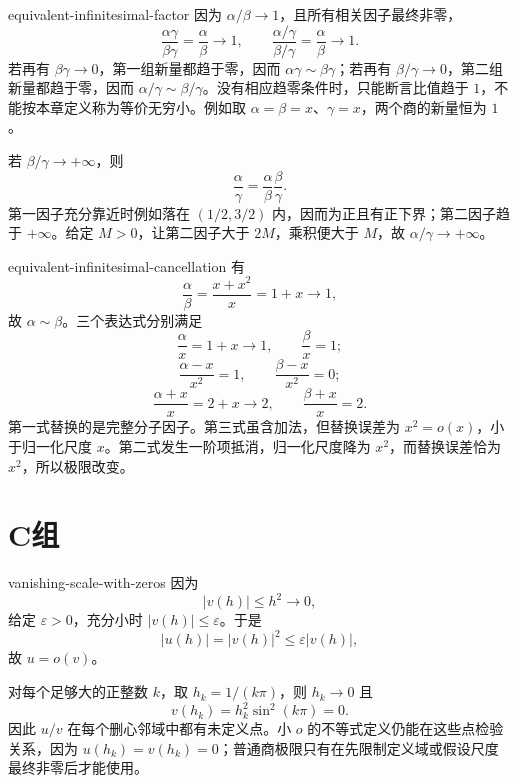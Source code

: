 \begin{solution}{equivalent-infinitesimal-factor}
因为 \(\alpha/\beta\to1\)，且所有相关因子最终非零，
\[
 \frac{\alpha\gamma}{\beta\gamma}
 =\frac\alpha\beta\longrightarrow1,
\qquad
 \frac{\alpha/\gamma}{\beta/\gamma}
 =\frac\alpha\beta\longrightarrow1.
\]
若再有 \(\beta\gamma\to0\)，第一组新量都趋于零，因而
\(\alpha\gamma\sim\beta\gamma\)；若再有 \(\beta/\gamma\to0\)，第二组新量都趋于零，因而
\(\alpha/\gamma\sim\beta/\gamma\)。没有相应趋零条件时，只能断言比值趋于 \(1\)，不能按本章定义称为等价无穷小。例如取
\(\alpha=\beta=x\)、\(\gamma=x\)，两个商的新量恒为 \(1\)。

若 \(\beta/\gamma\to+\infty\)，则
\[
 \frac\alpha\gamma
 =\frac\alpha\beta\frac\beta\gamma.
\]
第一因子充分靠近时例如落在 \((1/2,3/2)\) 内，因而为正且有正下界；第二因子趋于 \(+\infty\)。给定 \(M>0\)，让第二因子大于 \(2M\)，乘积便大于 \(M\)，故 \(\alpha/\gamma\to+\infty\)。
\end{solution}

\begin{solution}{equivalent-infinitesimal-cancellation}
有
\[
 \frac{\alpha}{\beta}
 =\frac{x+x^2}{x}=1+x\longrightarrow1,
\]
故 \(\alpha\sim\beta\)。三个表达式分别满足
\[
 \frac{\alpha}{x}=1+x\to1,\qquad
 \frac{\beta}{x}=1;
\]
\[
 \frac{\alpha-x}{x^2}=1,\qquad
 \frac{\beta-x}{x^2}=0;
\]
\[
 \frac{\alpha+x}{x}=2+x\to2,\qquad
 \frac{\beta+x}{x}=2.
\]
第一式替换的是完整分子因子。第三式虽含加法，但替换误差为 \(x^2=o(x)\)，小于归一化尺度 \(x\)。第二式发生一阶项抵消，归一化尺度降为 \(x^2\)，而替换误差恰为 \(x^2\)，所以极限改变。
\end{solution}

\section*{C组}

\begin{solution}{vanishing-scale-with-zeros}
因为
\[
 |v(h)|\le h^2\longrightarrow0,
\]
给定 \(\varepsilon>0\)，充分小时 \(|v(h)|\le\varepsilon\)。于是
\[
 |u(h)|=|v(h)|^2\le\varepsilon|v(h)|,
\]
故 \(u=o(v)\)。

对每个足够大的正整数 \(k\)，取 \(h_k=1/(k\pi)\)，则 \(h_k\to0\) 且
\[
 v(h_k)=h_k^2\sin^2(k\pi)=0.
\]
因此 \(u/v\) 在每个删心邻域中都有未定义点。小 \(o\) 的不等式定义仍能在这些点检验关系，因为 \(u(h_k)=v(h_k)=0\)；普通商极限只有在先限制定义域或假设尺度最终非零后才能使用。
\end{solution}

